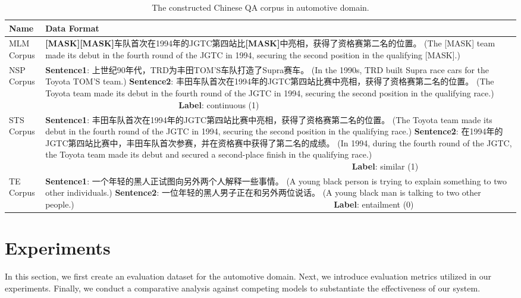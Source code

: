 \documentclass[mathematics,article,submit,moreauthors]{Definitions/mdpi}
\newcommand{\1}[1]{\mathds{1}\left[#1\right]}
\begin{document}
\begin{table}[H] 
	\caption{The constructed Chinese QA corpus in automotive domain.} \label{tab:annotated_corpus}
	\begin{tabularx}{\textwidth}{p{2cm}L} 
		\toprule
		\textbf{Name}  & \textbf{Data Format}	\\
		\midrule
		MLM Corpus  & \textbf{[MASK][MASK]}车队首次在1994年的JGTC第四站比\textbf{[MASK]}中亮相，获得了资格赛第二名的位置。{\color{blue} (The [MASK] team made its debut in the fourth round of the JGTC  in 1994, securing the second position in the qualifying [MASK].) } \\
		\midrule
		NSP Corpus  & \textbf{Sentence1}: 上世纪90年代，TRD为丰田TOM'S车队打造了Supra赛车。{\color{blue} (In the 1990s, TRD built Supra race cars for the Toyota TOM'S team.) }
		\textbf{Sentence2}: 丰田车队首次在1994年的JGTC第四站比赛中亮相，获得了资格赛第二名的位置。{\color{blue} (The Toyota team made its debut in the fourth round of the JGTC  in 1994, securing the second position in the qualifying race.)} ~~~~~~~~~~~~~~~~~~~~~~~~~~~~~~~~\textbf{Label}: continuous (1)\\
		\midrule
		STS Corpus & \textbf{Sentence1}: 丰田车队首次在1994年的JGTC第四站比赛中亮相，获得了资格赛第二名的位置。{\color{blue} (The Toyota team made its debut in the fourth round of the JGTC  in 1994, securing the second position in the qualifying race.)}
		\textbf{Sentence2}: 在1994年的JGTC第四站比赛中，丰田车队首次参赛，并在资格赛中获得了第二名的成绩。{\color{blue} (In 1994, during the fourth round of the JGTC, the Toyota team made its debut and secured a second-place finish in the qualifying race.)} ~~~~~~~~~~~~~~~~~~~~~~~~~~~~~~~~~~~~~~~~~~~~~~~~~~~~~~~~~~~~~~~~~~~~~~~~~ \textbf{Label}: similar (1) ~~~~~~~~		\\
		\midrule
		TE Corpus  &  \textbf{Sentence1}: 一个年轻的黑人正试图向另外两个人解释一些事情。{\color{blue} (A young black person is trying to explain something to two other individuals.)}
		\textbf{Sentence2}: 一位年轻的黑人男子正在和另外两位说话。{\color{blue} (A young black man is talking to two other people.)} ~~~~~~~~~~~~~~~~~~~~~~~~~~~~~~~~~~~~~~~~~~~~~~~~~~~~~~~~~~~~~ \textbf{Label}: entailment (0) ~~~~~		\\
		\bottomrule
	\end{tabularx}
\end{table}

\section{Experiments}
In this section, we first create an evaluation dataset for the automotive domain. Next, we introduce evaluation metrics utilized in our experiments. Finally, we conduct a comparative analysis against competing models to substantiate the effectiveness of our system.
\end{document}
